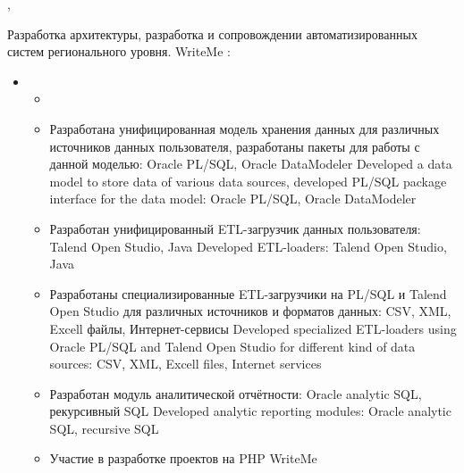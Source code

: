 \documentclass[11pt,a4paper,sans]{moderncv}        %
\begin{document}
\newpage

%
%


{\protect{}}
{\cityperm, \country}
{}
{
	{Разработка архитектуры, разработка и сопровождении автоматизированных систем регионального уровня.}
	{WriteMe}
  \newline{}
	\achievements:
	\begin{itemize}
	\item {}
		\begin{itemize}
			\item {}
			\item {}
				{Разработана унифицированная модель хранения данных для различных источников данных пользователя, разработаны пакеты для работы с данной моделью: Oracle PL/SQL, Oracle DataModeler}
				{Developed a data model to store data of various data sources, developed PL/SQL package interface for the data model: Oracle PL/SQL, Oracle DataModeler}
			\item {}
				{Разработан унифицированный ETL-загрузчик данных пользователя: Talend Open Studio, Java}
				{Developed ETL-loaders: Talend Open Studio, Java}
			\item {}
				{Разработаны специализированные ETL-загрузчики на PL/SQL и Talend Open Studio для различных источников и форматов данных: CSV, XML, Excell файлы, Интернет-сервисы}
				{Developed specialized ETL-loaders using Oracle PL/SQL and Talend Open Studio for different kind of data sources: CSV, XML, Excell files, Internet services}
			\item {}
				{Разработан модуль аналитической отчётности: Oracle analytic SQL, рекурсивный SQL}		
				{Developed analytic reporting modules: Oracle analytic SQL, recursive SQL}
			\item {}
				{Участие в разработке проектов на PHP}
				{WriteMe}

\end{itemize}
\end{itemize}}
\end{document}
